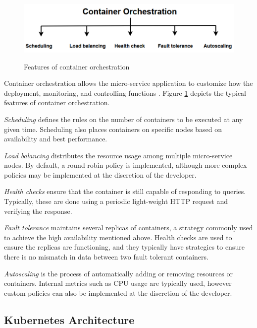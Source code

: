 \begin{figure}[htb]
    \centering
    \caption{Features of container orchestration}
    \includegraphics[width=0.9\linewidth]{Figures/Container-Orchestration.pdf}
    \label{fig:container-orchestration}
\end{figure}

Container orchestration allows the micro-service application to customize how the deployment, monitoring, and controlling functions \cite{casalicchio2019container}. Figure \ref{fig:container-orchestration} depicts the typical features of container orchestration.\par
\textit{Scheduling} defines the rules on the number of containers to be executed at any given time. Scheduling also places containers on specific nodes based on availability and best performance.\par
\textit{Load balancing} distributes the resource usage among multiple micro-service nodes. By default, a round-robin policy is implemented, although more complex policies may be implemented at the discretion of the developer.\par
\textit{Health checks} ensure that the container is still capable of responding to queries. Typically, these are done using a periodic light-weight HTTP request and verifying the response.\par
\textit{Fault tolerance} maintains several replicas of containers, a strategy commonly used to achieve the high availability mentioned above. Health checks are used to ensure the replicas are functioning, and they typically have strategies to ensure there is no mismatch in data between two fault tolerant containers.\par
\textit{Autoscaling} is the process of automatically adding or removing resources or containers. Internal metrics such as CPU usage are typically used, however custom policies can also be implemented at the discretion of the developer.\par

\subsection{Kubernetes Architecture}
\label{subsec:ch2-k8s-overview}


